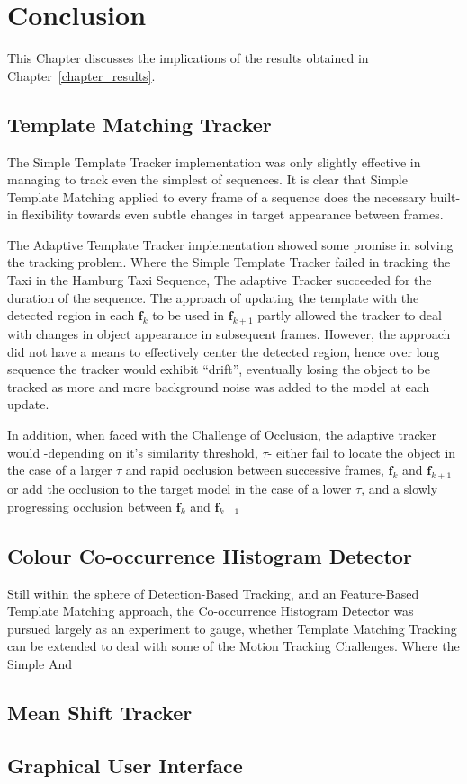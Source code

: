 \chapter{Conclusion}
This Chapter discusses the implications of the results obtained in
Chapter~\ref{chapter_results}. 

\section{Template Matching Tracker}
The Simple Template Tracker implementation was only slightly effective in
managing to track even the simplest of sequences. It is clear that Simple Template
Matching applied to every frame of a sequence does the necessary built-in
flexibility towards even subtle changes in target appearance between frames.

The Adaptive Template Tracker implementation showed some promise in solving the
tracking problem. Where the Simple Template Tracker failed in tracking the
Taxi in the Hamburg Taxi Sequence, The adaptive Tracker succeeded for the
duration of the sequence. 
The approach of updating the template with the detected region in each
$\mathbf{f}_k$ to be used in $\mathbf{f}_{k+1}$ partly allowed the tracker to
deal with changes in object appearance in subsequent frames. However, the
approach did not have a means to effectively center the detected region, hence
over long sequence the tracker would exhibit ``drift'', eventually losing the
object to be tracked as more and more background noise was added to the model at
each update.

In addition, when faced with the Challenge of Occlusion, the adaptive tracker
would -depending on it's similarity threshold, $\tau$- either fail to locate the
object in the case of a larger $\tau$ and rapid occlusion between successive
frames, $\mathbf{f}_k$ and $\mathbf{f}_{k+1}$ or add the occlusion to the target
model in the case of a lower $\tau$, and a slowly progressing occlusion between
$\mathbf{f}_k$ and $\mathbf{f}_{k+1}$ 

\section{Colour Co-occurrence Histogram Detector}
Still within the sphere of Detection-Based Tracking, and an Feature-Based
Template Matching approach, the Co-occurrence Histogram Detector was pursued largely as an
experiment to gauge, whether Template Matching Tracking can be extended to deal
with some of the Motion Tracking Challenges. 
Where the Simple And


\section{Mean Shift Tracker}

\section{Graphical User Interface}

